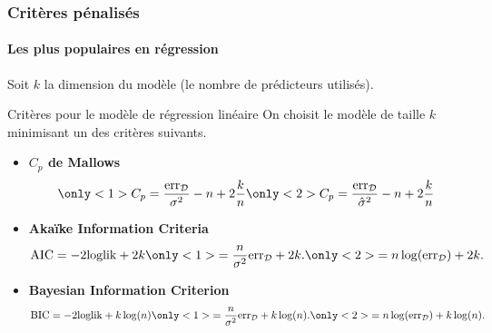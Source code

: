 \documentclass{beamer}\usepackage[]{graphicx}\usepackage[]{color}
\begin{document}
\begin{frame}
  \frametitle{Critères pénalisés}
  \framesubtitle{Les plus populaires en régression}

    Soit $k$ la dimension du modèle (le nombre de prédicteurs utilisés).
    
    \vfill

    \begin{block}{Critères  pour  le  modèle  de  régression  linéaire
        }
      On choisit le modèle de taille $k$ minimisant un des critères suivants.
      \begin{itemize}
      \item \alert{\bf $C_p$ de Mallows} 
        \[
        \only<1>{C_p= \frac{\mathrm{err}_{\mathcal{D}}}{\sigma^2} - n + 2 \frac{k}{n} }
        \only<2>{C_p= \frac{\mathrm{err}_{\mathcal{D}}}{\hat{\sigma}^2} - n + 2 \frac{k}{n} }        
        \]
    \item      \alert{\bf      Aka\"ike     Information      Criteria}
       
      \[ 
      \mathrm{AIC} = - 2 \mathrm{loglik} + 2 k
      \only<1>{ = \frac{n}{\sigma^2} \mathrm{err}_{\mathcal{D}} + 2 k .}
      \only<2>{ = n \log(\mathrm{err}_{\mathcal{D}}) + 2 k .}
      \]
      
    \item \alert{\bf Bayesian Information Criterion} 
      \[ 
      \mathrm{BIC} = - 2 \mathrm{loglik} + k \log(n)
      \only<1>{ = \frac{n}{\sigma^2} \mathrm{err}_{\mathcal{D}} + k \log(n) .}
      \only<2>{ = n \log(\mathrm{err}_{\mathcal{D}}) + k \log(n) .}
      \]
    \end{itemize}
    \end{block}
  
\end{frame}
\end{document}

